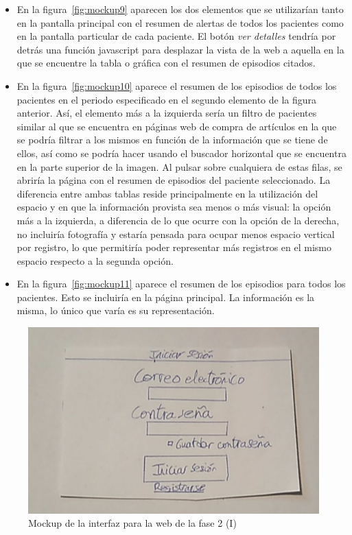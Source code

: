 \begin{itemize}
    \item En la figura~\ref{fig:mockup9} aparecen los dos elementos que se utilizarían tanto en la pantalla principal con el resumen de alertas de todos los pacientes como en la pantalla particular de cada paciente. El botón \textit{ver detalles} tendría por detrás una función javascript para desplazar la vista de la web a aquella en la que se encuentre la tabla o gráfica con el resumen de episodios citados.
    \item En la figura~\ref{fig:mockup10} aparece el resumen de los episodios de todos los pacientes en el periodo especificado en el segundo elemento de la figura anterior. Así, el elemento más a la izquierda sería un filtro de pacientes similar al que se encuentra en páginas web de compra de artículos en la que se podría filtrar a los mismos en función de la información que se tiene de ellos, así como se podría hacer usando el buscador horizontal que se encuentra en la parte superior de la imagen. Al pulsar sobre cualquiera de estas filas, se abriría la página con el resumen de episodios del paciente seleccionado. La diferencia entre ambas tablas reside principalmente en la utilización del espacio y en que la información provista sea menos o más visual: la opción más a la izquierda, a diferencia de lo que ocurre con la opción de la derecha, no incluiría fotografía y estaría pensada para ocupar menos espacio vertical por registro, lo que permitiría poder representar más registros en el mismo espacio respecto a la segunda opción.
    \item En la figura~\ref{fig:mockup11} aparece el resumen de los episodios para todos los pacientes. Esto se incluiría en la página principal. La información es la misma, lo único que varía es su representación.
\end{itemize}

\begin{figure}[!htbp]
    \centering
    \includegraphics[scale=0.3]{Imagenes/anxA2.jpg}
    \caption[Mockup de la interfaz para la web de la fase 1 (I)]{Mockup de la interfaz para la web de la fase 2 (I)}
    \label{fig:mockup2}
\end{figure}

